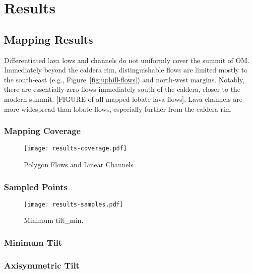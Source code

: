 \chapter{Results}

\section{Mapping Results}

Differentiated lava lows and channels do not uniformly cover the summit of \acf{OM}. Immediately beyond the caldera rim, distinguishable flows are limited mostly to the south-east (e.g., Figure~\ref{fig:uphill-flows}) and north-west margins. Notably, there are essentially zero flows immediately south of the caldera, closer to the modern summit. [FIGURE of all mapped lobate lava flows]. Lava channels are more widespread than lobate flows, especially further from the caldera rim 

\subsection{Mapping Coverage}
\begin{figure}
    \texttt{[image: results-coverage.pdf]}%
    \caption[Mapping Coverage]{Polygon Flows and Linear Channels}%
    \label{fig:results-coverage}
\end{figure}
\subsection{Sampled Points}
\begin{figure}
    \texttt{[image: results-samples.pdf]}%
    \caption[Sampling Coverage]{Minimum \acf{tilt_min}.}%
    \label{fig:results-samples}
\end{figure}
\subsection{Minimum Tilt}
\subsection{Axisymmetric Tilt}

